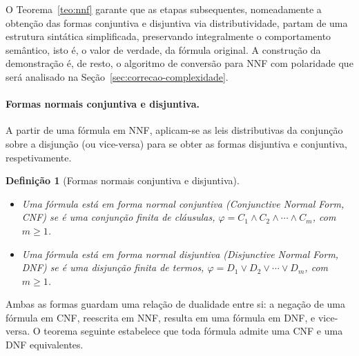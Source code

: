 \documentclass[12pt,a4paper,oneside]{report}
\theoremstyle{tituloplain}
\theoremstyle{titulodef}
\newtheorem{definicao}[teorema]{Definição}
\begin{document}
O Teorema~\ref{teo:nnf} garante que as etapas subsequentes, nomeadamente a obtenção das formas conjuntiva e disjuntiva via distributividade, partam de uma estrutura sintática simplificada, preservando integralmente o comportamento semântico, isto é, o valor de verdade, da fórmula original. A construção da demonstração é, de resto, o algoritmo de conversão para NNF com polaridade que será analisado na Seção~\ref{sec:correcao-complexidade}.

\paragraph{Formas normais conjuntiva e disjuntiva.} A partir de uma fórmula em NNF, aplicam-se as leis distributivas da conjunção sobre a disjunção (ou vice-versa) para se obter as formas disjuntiva e conjuntiva, respetivamente.

\begin{definicao}[Formas normais conjuntiva e disjuntiva]\label{def:cnf-dnf}
\leavevmode\vspace{-0.6\baselineskip}
\begin{itemize}
  \item Uma fórmula está em \emph{forma normal conjuntiva} (\textit{Conjunctive Normal Form}, CNF) se é uma conjunção finita de cláusulas, $\varphi=C_1\wedge C_2\wedge\cdots\wedge C_m$, com $m\geq 1$.
  \item Uma fórmula está em \emph{forma normal disjuntiva} (\textit{Disjunctive Normal Form}, DNF) se é uma disjunção finita de termos, $\varphi=D_1\vee D_2\vee\cdots\vee D_m$, com $m\geq 1$.
\end{itemize}
\end{definicao}

Ambas as formas guardam uma relação de dualidade entre si: a negação de uma fórmula em CNF, reescrita em NNF, resulta em uma fórmula em DNF, e vice-versa. O teorema seguinte estabelece que toda fórmula admite uma CNF e uma DNF equivalentes.
\end{document}
